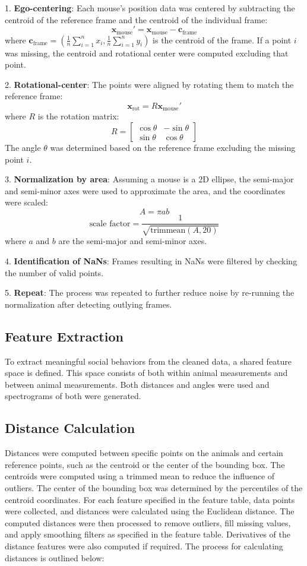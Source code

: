 \documentclass[12pt,english]{article}
\begin{document}
1. \textbf{Ego-centering}: Each mouse's position data was centered by subtracting the centroid of the reference frame and the centroid of the individual frame:
   \[
   \mathbf{x}_{\text{mouse}}' = \mathbf{x}_{\text{mouse}} - \mathbf{c}_{\text{frame}}
   \]
   where \(\mathbf{c}_{\text{frame}} = \left(\frac{1}{n}\sum_{i=1}^n x_i, \frac{1}{n}\sum_{i=1}^n y_i\right)\) is the centroid of the frame. If a point \(i\) was missing, the centroid and rotational center were computed excluding that point.

2. \textbf{Rotational-center}: The points were aligned by rotating them to match the reference frame:
   \[
   \mathbf{x}_{\text{rot}} = R \mathbf{x}_{\text{mouse}}'
   \]
   where \(R\) is the rotation matrix:
   \[
   R = \begin{bmatrix}
   \cos\theta & -\sin\theta \\
   \sin\theta & \cos\theta
   \end{bmatrix}
   \]
   The angle \(\theta\) was determined based on the reference frame excluding the missing point \(i\).

3. \textbf{Normalization by area}: Assuming a mouse is a 2D ellipse, the semi-major and semi-minor axes were used to approximate the area, and the coordinates were scaled:
   \[
   A = \pi a b
   \]
   \[
   \text{scale factor} = \frac{1}{\sqrt{\text{trimmean}(A, 20)}}
   \]
   where \(a\) and \(b\) are the semi-major and semi-minor axes.

4. \textbf{Identification of NaNs}: Frames resulting in NaNs were filtered by checking the number of valid points.

5. \textbf{Repeat}: The process was repeated to further reduce noise by re-running the normalization after detecting outlying frames.


\subsection{Feature Extraction}
To extract meaningful social behaviors from the cleaned data, a shared feature space is defined. This space consists of both within animal measurements and between animal measurements. Both distances and angles were used and spectrograms of both were generated.



\subsection{Distance Calculation}
Distances were computed between specific points on the animals and certain reference points, such as the centroid or the center of the bounding box. The centroids were computed using a trimmed mean to reduce the influence of outliers. The center of the bounding box was determined by the percentiles of the centroid coordinates. For each feature specified in the feature table, data points were collected, and distances were calculated using the Euclidean distance. The computed distances were then processed to remove outliers, fill missing values, and apply smoothing filters as specified in the feature table. Derivatives of the distance features were also computed if required. The process for calculating distances is outlined below:
\end{document}
